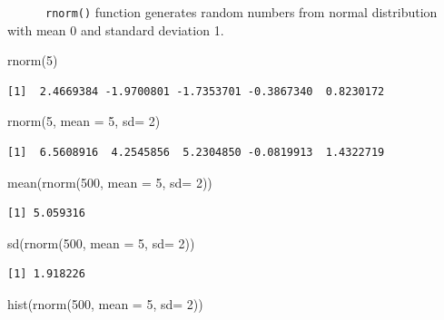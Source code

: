 \documentclass[
  letterpaper,
  DIV=11,
  numbers=noendperiod]{scrreprt}
\newenvironment{Shaded}{\begin{snugshade}}{\end{snugshade}}
\newcommand{\AttributeTok}[1]{\textcolor[rgb]{0.40,0.45,0.13}{#1}}
\newcommand{\DecValTok}[1]{\textcolor[rgb]{0.68,0.00,0.00}{#1}}
\newcommand{\FunctionTok}[1]{\textcolor[rgb]{0.28,0.35,0.67}{#1}}
\newcommand{\NormalTok}[1]{\textcolor[rgb]{0.00,0.23,0.31}{#1}}
\begin{document}
~~~~~~\texttt{rnorm()} function generates random numbers from normal
distribution with mean 0 and standard deviation 1.

\begin{Shaded}
\begin{Highlighting}[]
\FunctionTok{rnorm}\NormalTok{(}\DecValTok{5}\NormalTok{)}
\end{Highlighting}
\end{Shaded}

\begin{verbatim}
[1]  2.4669384 -1.9700801 -1.7353701 -0.3867340  0.8230172
\end{verbatim}

\begin{Shaded}
\begin{Highlighting}[]
\FunctionTok{rnorm}\NormalTok{(}\DecValTok{5}\NormalTok{, }\AttributeTok{mean =} \DecValTok{5}\NormalTok{, }\AttributeTok{sd=} \DecValTok{2}\NormalTok{)}
\end{Highlighting}
\end{Shaded}

\begin{verbatim}
[1]  6.5608916  4.2545856  5.2304850 -0.0819913  1.4322719
\end{verbatim}

\begin{Shaded}
\begin{Highlighting}[]
\FunctionTok{mean}\NormalTok{(}\FunctionTok{rnorm}\NormalTok{(}\DecValTok{500}\NormalTok{, }\AttributeTok{mean =} \DecValTok{5}\NormalTok{, }\AttributeTok{sd=} \DecValTok{2}\NormalTok{))}
\end{Highlighting}
\end{Shaded}

\begin{verbatim}
[1] 5.059316
\end{verbatim}

\begin{Shaded}
\begin{Highlighting}[]
\FunctionTok{sd}\NormalTok{(}\FunctionTok{rnorm}\NormalTok{(}\DecValTok{500}\NormalTok{, }\AttributeTok{mean =} \DecValTok{5}\NormalTok{, }\AttributeTok{sd=} \DecValTok{2}\NormalTok{))}
\end{Highlighting}
\end{Shaded}

\begin{verbatim}
[1] 1.918226
\end{verbatim}

\begin{Shaded}
\begin{Highlighting}[]
\FunctionTok{hist}\NormalTok{(}\FunctionTok{rnorm}\NormalTok{(}\DecValTok{500}\NormalTok{, }\AttributeTok{mean =} \DecValTok{5}\NormalTok{, }\AttributeTok{sd=} \DecValTok{2}\NormalTok{))}
\end{Highlighting}
\end{Shaded}
\end{document}
